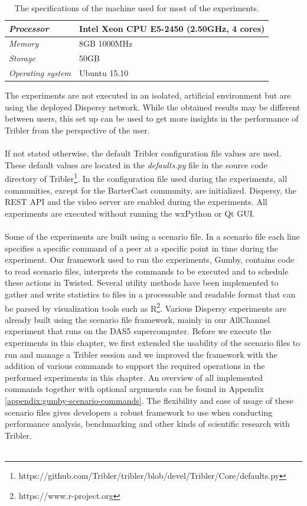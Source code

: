 \begin{table}[h!]
	\centering
	\begin{tabular}{|l|l|}
		\hline
		\emph{Processor} & Intel Xeon CPU E5-2450 (2.50GHz, 4 cores)\\ \hline
		\emph{Memory} & 8GB 1000MHz \\ \hline
		\emph{Storage} & 50GB \\ \hline
		\emph{Operating system} & Ubuntu 15.10 \\ \hline
	\end{tabular}
	\caption{The specifications of the machine used for most of the experiments.}
	\label{table:experiments-server-specifications}
\end{table}

The experiments are not executed in an isolated, artificial environment but are using the deployed Dispersy network. While the obtained results may be different between users, this set up can be used to get more insights in the performance of Tribler from the perspective of the user.\\\\
If not stated otherwise, the default Tribler configuration file values are used. These default values are located in the \emph{defaults.py} file in the source code directory of Tribler\footnote{https://github.com/Tribler/tribler/blob/devel/Tribler/Core/defaults.py}. In the configuration file used during the experiments, all communities, except for the BarterCast community, are initialized. Dispersy, the REST API and the video server are enabled during the experiments. All experiments are executed without running the wxPython or Qt GUI.\\\\
Some of the experiments are built using a scenario file. In a scenario file each line specifies a specific command of a peer at a specific point in time during the experiment. Our framework used to run the experiments, Gumby, contains code to read scenario files, interprets the commands to be executed and to schedule these actions in Twisted. Several utility methods have been implemented to gather and write statistics to files in a processable and readable format that can be parsed by visualization tools such as R\footnote{https://www.r-project.org}. Various Dispersy experiments are already built using the scenario file framework, mainly in our AllChannel experiment that runs on the DAS5 supercomputer. Before we execute the experiments in this chapter, we first extended the usability of the scenario files to run and manage a Tribler session and we improved the framework with the addition of various commands to support the required operations in the performed experiments in this chapter. An overview of all implemented commands together with optional arguments can be found in Appendix \ref{appendix:gumby-scenario-commands}. The flexibility and ease of usage of these scenario files gives developers a robust framework to use when conducting performance analysis, benchmarking and other kinds of scientific research with Tribler.\\\\
